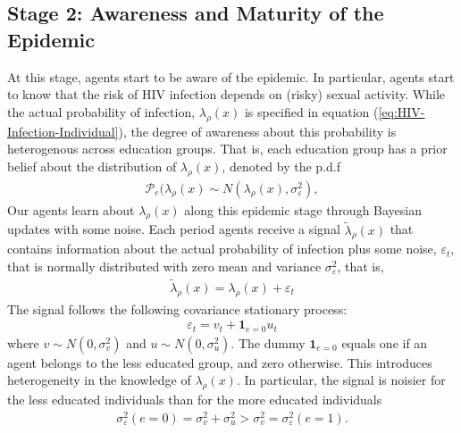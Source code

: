 \clearpage
\subsection*{\sf Stage 2: Awareness and Maturity of the Epidemic}

At this stage, agents start to be aware of the epidemic. In particular, agents start to know that the risk of HIV infection depends on (risky) sexual activity. While the actual probability of infection, $\lambda_\rho(x)$ is specified in equation (\ref{eq:HIV-Infection-Individual}), the degree of awareness about this probability is heterogenous across education groups. That is, each education group has a prior belief about the distribution of $\lambda_\rho(x)$, denoted by the p.d.f 
\begin{align}
    \mathcal{P}_{e}(\lambda_\rho(x)\sim N(\lambda_\rho(x),\sigma^{2}_\varepsilon),
\end{align} 
Our agents learn about $\lambda_\rho(x)$ along this epidemic stage through Bayesian updates with some noise. Each period agents receive a signal $\widetilde{\lambda}_\rho(x)$ that contains information about the actual probability of infection plus some noise, $\varepsilon_{t}$, that is normally distributed with zero mean and variance $\sigma^{2}_{\varepsilon}$, that is,
\begin{align}
   \widetilde{\lambda}_\rho(x)= \lambda_\rho(x) + \varepsilon_t %
\end{align}
The signal follows the following covariance stationary process:
\begin{align}
   \varepsilon_t= v_{t} + \textbf{1}_{e=0} u_t %
\end{align}
where $v\sim N(0,\sigma^{2}_v)$ and $u\sim N(0,\sigma^{2}_u)$. The dummy $\textbf{1}_{e=0}$ equals one if an agent belongs to the less educated group, and zero otherwise. This introduces heterogeneity in the knowledge of $\lambda_\rho(x)$. In particular, the signal is noisier for the less educated individuals than for the more educated individuals
\begin{align}\label{eq:noise}
    \sigma^{2}_{\varepsilon} (e=0) = \sigma^{2}_{v} + \sigma^{2}_{u} > \sigma^{2}_{v}=\sigma^{2}_{\varepsilon}(e=1).
\end{align}
